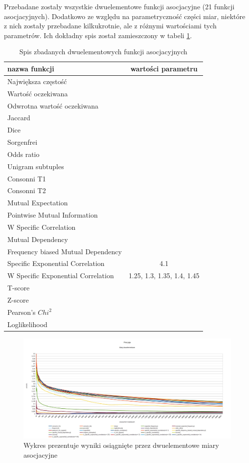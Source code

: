\documentclass[11pt,a4paper]{llncs}
\begin{document}
Przebadane zostały wszystkie dwuelementowe funkcji asocjacyjne (21 funkcji asocjacyjnych).
Dodatkowo ze względu na parametryczność części miar, niektóre z nich zostały przebadane kilkukrotnie, ale z różnymi wartościami tych parametrów.
Ich dokładny spis został zamieszczony w tabeli \ref{research_2_assoc}.
\begin{table}[h!]
\centering
\begin{tabular}{ l | c }
	\toprule
	nazwa funkcji & wartości parametru\\
	\midrule
	Największa częstość & \\
	Wartość oczekiwana & \\
	Odwrotna wartość oczekiwana & \\
	Jaccard & \\
	Dice	 & \\
	Sorgenfrei & \\
	Odds ratio & \\
	Unigram subtuples & \\
	Consonni T1 & \\
	Consonni T2 & \\
	Mutual Expectation & \\
	Pointwise Mutual Information & \\
	W Specific Correlation & \\
	Mutual Dependency & \\
	Frequency biased Mutual Dependency & \\
	Specific Exponential Correlation & 4.1\\
	W Specific Exponential Correlation & 1.25, 1.3, 1.35, 1.4, 1.45\\
	T-score & \\
	Z-score & \\
	Pearson's \(Chi^{2}\) & \\
	Loglikelihood & \\
	\bottomrule
\end{tabular}
\caption[Spis zbadanych dwuelementowych funkcji asocjacyjnych]{Spis zbadanych dwuelementowych funkcji asocjacyjnych}
\label{research_2_assoc}
\end{table}

\begin{figure}[h!]
\centering
\includegraphics[width=\textwidth]{charts/wyniki_2.jpg}
\caption [Wyniki miar dwuelementowych]{Wykres prezentuje wyniki osiągnięte przez dwuelementowe miary asocjacyjne}
\label{w1}
\end{figure}
\end{document}

